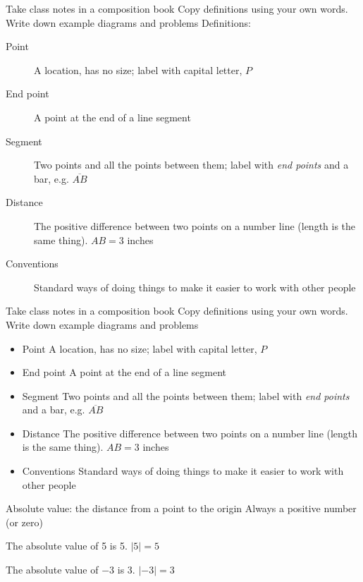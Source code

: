 \begin{frame}{Take class notes in a composition book}
  {Copy definitions using your own words. Write down example diagrams and problems}
  Definitions: \bigskip
    \begin{description}
      \item[Point] A location, has no size; label with capital letter, $P$
      \item[End point] A point at the end of a line segment
      \item[Segment] Two points and all the points between them; label with \emph{end points} and a bar, e.g. $\overline{AB}$
      \item[Distance] The positive difference between two points on a number line (length is the same thing). $AB=3$ inches
      \item[Conventions] Standard ways of doing things to make it easier to work with other people
    \end{description}
\end{frame}


\begin{frame}{Take class notes in a composition book}
  {Copy definitions using your own words. Write down example diagrams and problems}
    \begin{definition}
      \begin{itemize}
        \item Point A location, has no size; label with capital letter, $P$
        \item End point A point at the end of a line segment
        \item Segment Two points and all the points between them; label with \emph{end points} and a bar, e.g. $\overline{AB}$
        \item Distance The positive difference between two points on a number line (length is the same thing). $AB=3$ inches
        \item Conventions Standard ways of doing things to make it easier to work with other people
      \end{itemize}
    \end{definition}
\end{frame}

\begin{frame}{Absolute value: the distance from a point to the origin}
  {Always a positive number (or zero)}
     \par \bigskip
    The absolute value of 5 is 5. $|5|=5$ \par \bigskip
    The absolute value of $-3$ is 3. $|-3|=3$
\end{frame}

